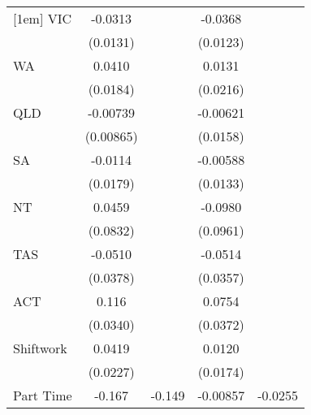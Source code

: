 {\begin{tabular}{l*{4}{c}}
[1em]
VIC                 &     -0.0313\sym{*}  &                     &     -0.0368\sym{**} &                     \\
                    &    (0.0131)         &                     &    (0.0123)         &                     \\
[1em]
WA                  &      0.0410\sym{*}  &                     &      0.0131         &                     \\
                    &    (0.0184)         &                     &    (0.0216)         &                     \\
[1em]
QLD                 &    -0.00739         &                     &    -0.00621         &                     \\
                    &   (0.00865)         &                     &    (0.0158)         &                     \\
[1em]
SA                  &     -0.0114         &                     &    -0.00588         &                     \\
                    &    (0.0179)         &                     &    (0.0133)         &                     \\
[1em]
NT                  &      0.0459         &                     &     -0.0980         &                     \\
                    &    (0.0832)         &                     &    (0.0961)         &                     \\
[1em]
TAS                 &     -0.0510         &                     &     -0.0514         &                     \\
                    &    (0.0378)         &                     &    (0.0357)         &                     \\
[1em]
ACT                 &       0.116\sym{***}&                     &      0.0754\sym{*}  &                     \\
                    &    (0.0340)         &                     &    (0.0372)         &                     \\
[1em]
Shiftwork           &      0.0419         &                     &      0.0120         &                     \\
                    &    (0.0227)         &                     &    (0.0174)         &                     \\
[1em]
Part Time           &      -0.167\sym{***}&      -0.149\sym{***}&    -0.00857         &     -0.0255\sym{*}  \\

\end{tabular}}
